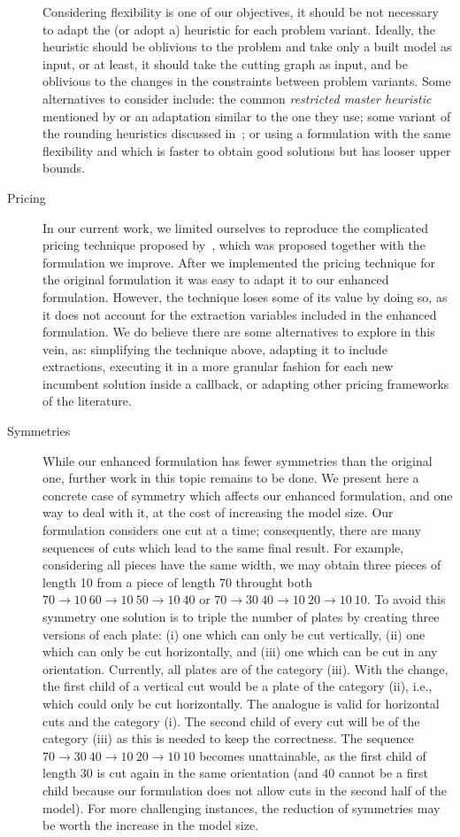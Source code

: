 \begin{description}
	Considering flexibility is one of our objectives, it should be not necessary to adapt the (or adopt a) heuristic for each problem variant.
	Ideally, the heuristic should be oblivious to the problem and take only a built model as input, or at least, it should take the cutting graph as input, and be oblivious to the changes in the constraints between problem variants.
	Some alternatives to consider include: the common \emph{restricted master heuristic} mentioned by \citet{delorme:2019} or an adaptation similar to the one they use; some variant of the rounding heuristics discussed in~\citet{alvarez:2002:LP}; or using a formulation with the same flexibility and which is faster to obtain good solutions but has looser upper bounds.
\item[Pricing]
	In our current work, we limited ourselves to reproduce the complicated pricing technique proposed by~\citet{furini:2016}, which was proposed together with the formulation we improve.
	After we implemented the pricing technique for the original formulation it was easy to adapt it to our enhanced formulation. However, the technique loses some of its value by doing so, as it does not account for the extraction variables included in the enhanced formulation.
	We do believe there are some alternatives to explore in this vein, as: simplifying the technique above, adapting it to include extractions, executing it in a more granular fashion for each new incumbent solution inside a callback, or adapting other pricing frameworks of the literature.
\item[Symmetries]
	While our enhanced formulation has fewer symmetries than the original one, further work in this topic remains to be done.
	We present here a concrete case of symmetry which affects our enhanced formulation, and one way to deal with it, at the cost of increasing the model size.
	Our formulation considers one cut at a time; consequently, there are many sequences of cuts which lead to the same final result.
	For example, considering all pieces have the same width, we may obtain three pieces of length 10 from a piece of length 70 throught both \(70 \rightarrow 10~60 \rightarrow 10~50 \rightarrow 10~40\) or \(70 \rightarrow 30~40 \rightarrow 10~20 \rightarrow 10~10\).
	To avoid this symmetry one solution is to triple the number of plates by creating three versions of each plate: (i) one which can only be cut vertically, (ii) one which can only be cut horizontally, and (iii) one which can be cut in any orientation.
	Currently, all plates are of the category (iii).
	With the change, the first child of a vertical cut would be a plate of the category (ii), i.e., which could only be cut horizontally. The analogue is valid for horizontal cuts and the category (i). The second child of every cut will be of the category (iii) as this is needed to keep the correctness.
	The sequence \(70 \rightarrow 30~40 \rightarrow 10~20 \rightarrow 10~10\) becomes unattainable, as the first child of length 30 is cut again in the same orientation (and \(40\) cannot be a first child because our formulation does not allow cuts in the second half of the model).
	For more challenging instances, the reduction of symmetries may be worth the increase in the model size.
\end{description}

